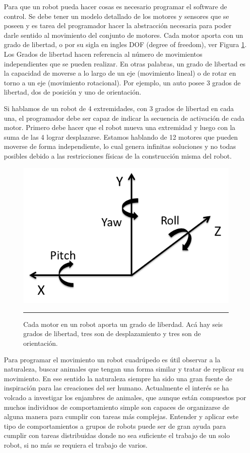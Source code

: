 Para que un robot pueda hacer cosas es necesario programar el software de control. Se debe tener un modelo detallado de los motores y sensores que se poseen y es tarea del programador hacer la abstracción necesaria para poder darle sentido al movimiento del conjunto de motores. Cada motor aporta con un grado de libertad, o por su sigla en ingles DOF (degree of freedom), ver Figura \ref{fig:grados de libertad}. Los Grados de libertad hacen referencia al número de movimientos independientes que se pueden realizar. En otras palabras, un grado de libertad es la capacidad de moverse a lo largo de un eje (movimiento lineal) o de rotar en torno a un eje (movimiento rotacional). Por ejemplo, un auto posee 3 grados de libertad, dos de posición y uno de orientación. 

Si hablamos de un robot de 4 extremidades, con 3 grados de libertad en cada una, el programador debe ser capaz de indicar la secuencia de activación de cada motor. Primero debe hacer que el robot mueva una extremidad y luego con la suma de las 4 lograr desplazarse. Estamos hablando de 12 motores que pueden moverse de forma independiente, lo cual genera infinitas soluciones y no todas posibles debido a las restricciones físicas de la construcción misma del robot.

\begin{figure}[htbp]
	\centering
		\includegraphics[width=\textwidth]{./Figures/6DOF.png}
		\rule{35em}{0.5pt}
	\caption[Grados de libertad]{Cada motor en un robot aporta un grado de liberdad. Acá hay seis grados de libertad, tres son de desplazamiento y tres son de orientación.}
	\label{fig:grados de libertad}
\end{figure}

Para programar el movimiento un robot cuadrúpedo es útil observar a la naturaleza, buscar animales que tengan una forma similar y tratar de replicar su movimiento. En ese sentido la naturaleza siempre ha sido una gran fuente de inspiración para las creaciones del ser humano. Actualmente el interés se ha volcado a investigar los enjambres de animales, que aunque están compuestos por muchos individuos de comportamiento simple son capaces de organizarse de alguna manera para cumplir con tareas más complejas. Entender y aplicar este tipo de comportamientos a grupos de robots puede ser de gran ayuda para cumplir con tareas distribuidas donde no sea suficiente el trabajo de un solo robot, si no más se requiera el trabajo de varios.


